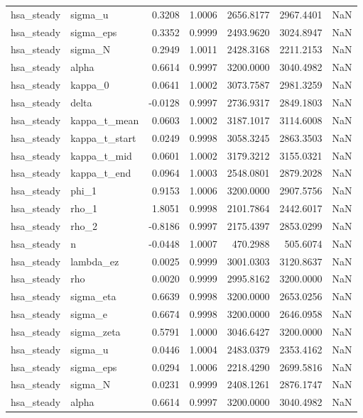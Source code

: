 \begin{tabular}{llrrrrl}
hsa\_steady & sigma\_u & 0.3208 & 1.0006 & 2656.8177 & 2967.4401 & NaN \\
hsa\_steady & sigma\_eps & 0.3352 & 0.9999 & 2493.9620 & 3024.8947 & NaN \\
hsa\_steady & sigma\_N & 0.2949 & 1.0011 & 2428.3168 & 2211.2153 & NaN \\
hsa\_steady & alpha & 0.6614 & 0.9997 & 3200.0000 & 3040.4982 & NaN \\
hsa\_steady & kappa\_0 & 0.0641 & 1.0002 & 3073.7587 & 2981.3259 & NaN \\
hsa\_steady & delta & -0.0128 & 0.9997 & 2736.9317 & 2849.1803 & NaN \\
hsa\_steady & kappa\_t\_mean & 0.0603 & 1.0002 & 3187.1017 & 3114.6008 & NaN \\
hsa\_steady & kappa\_t\_start & 0.0249 & 0.9998 & 3058.3245 & 2863.3503 & NaN \\
hsa\_steady & kappa\_t\_mid & 0.0601 & 1.0002 & 3179.3212 & 3155.0321 & NaN \\
hsa\_steady & kappa\_t\_end & 0.0964 & 1.0003 & 2548.0801 & 2879.2028 & NaN \\
hsa\_steady & phi\_1 & 0.9153 & 1.0006 & 3200.0000 & 2907.5756 & NaN \\
hsa\_steady & rho\_1 & 1.8051 & 0.9998 & 2101.7864 & 2442.6017 & NaN \\
hsa\_steady & rho\_2 & -0.8186 & 0.9997 & 2175.4397 & 2853.0299 & NaN \\
hsa\_steady & n & -0.0448 & 1.0007 & 470.2988 & 505.6074 & NaN \\
hsa\_steady & lambda\_ez & 0.0025 & 0.9999 & 3001.0303 & 3120.8637 & NaN \\
hsa\_steady & rho & 0.0020 & 0.9999 & 2995.8162 & 3200.0000 & NaN \\
hsa\_steady & sigma\_eta & 0.6639 & 0.9998 & 3200.0000 & 2653.0256 & NaN \\
hsa\_steady & sigma\_e & 0.6674 & 0.9998 & 3200.0000 & 2646.0958 & NaN \\
hsa\_steady & sigma\_zeta & 0.5791 & 1.0000 & 3046.6427 & 3200.0000 & NaN \\
hsa\_steady & sigma\_u & 0.0446 & 1.0004 & 2483.0379 & 2353.4162 & NaN \\
hsa\_steady & sigma\_eps & 0.0294 & 1.0006 & 2218.4290 & 2699.5816 & NaN \\
hsa\_steady & sigma\_N & 0.0231 & 0.9999 & 2408.1261 & 2876.1747 & NaN \\
hsa\_steady & alpha & 0.6614 & 0.9997 & 3200.0000 & 3040.4982 & NaN \\

\end{tabular}
